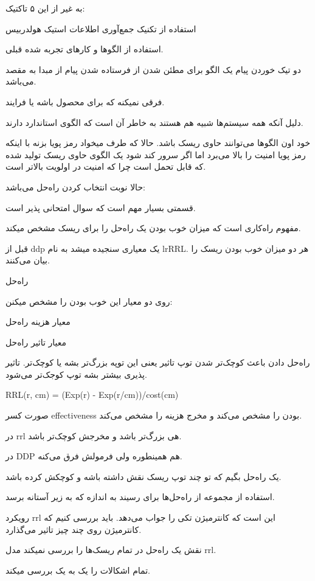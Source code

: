 به غیر از این ۵ تاکتیک:

استفاده از تکنیک جمع‌آوری اطلاعات استیک هولدربیس

استفاده از الگو‌ها و کار‌های تجربه شده قبلی.

دو تیک خوردن پیام یک الگو برای مطئن شدن از فرستاده شدن پیام از مبدا به مقصد
می‌باشد.

فرقی نمیکنه که برای محصول باشه یا فرایند.

دلیل آنکه همه سیستم‌ها شبیه هم هستند به خاطر آن است که الگوی استاندارد دارند.

خود اون الگو‌ها می‌توانند حاوی ریسک باشد. حالا که طرف میخواد رمز پویا بزنه با
اینکه رمز پویا امنیت را بالا می‌برد اما اگر سرور کند شود یک الگوی حاوی ریسک
تولید شده که قابل تحمل است چرا که امنیت در اولویت بالاتر است.

حالا نوبت انتخاب کردن راه‌حل می‌باشد:

قسمتی بسیار مهم است که سوال امتحانی پذیر است.

مفهوم  راه‌کاری است که میزان خوب بودن یک راه‌حل را برای ریسک مشخص میکند.


قبل از ddp یک معیاری سنجیده میشد به نام lr{RRL}.
هر دو میزان خوب بودن ریسک را بیان می‌کنند.

راه‌حل 

روی دو معیار این خوب بودن را مشخص میکنن:

معیار هزینه راه‌حل

معیار تاثیر راه‌حل

راه‌حل دادن باعث کوچک‌تر شدن توپ تاثیر یعنی این توپه بزرگ‌تر بشه یا کوچک‌تر.
تاثیر پذیری بیشتر بشه توپ کوجک‌تر می‌شود.

RRL(r, cm) = (Exp(r) - Exp(r/cm))/cost(cm)

صورت کسر effectiveness بودن را مشخص می‌کند و مخرج هزینه را مشخص می‌کند. 

در rrl هی بزرگ‌تر باشد و مخرجش کوچک‌تر باشد.

در DDP هم همینطوره ولی فرمولش فرق می‌کنه.

یک راه‌حل بگیم که تو چند توپ ریسک نقش داشته باشه و کوچکش کرده باشد.

استفاده از مجموعه از راه‌حل‌ها برای رسیند به اندازه که به زیر آستانه برسد.

رویکرد rrl این است که کانترمیژن تکی را جواب می‌دهد. باید بررسی کنیم که کانترمیژن
روی چند چیز تاثیر می‌گذارد. 

نقش یک راه‌حل در تمام ریسک‌ها را بررسی نمیکند مدل rrl.

تمام اشکالات را یک به یک بررسی میکند.

